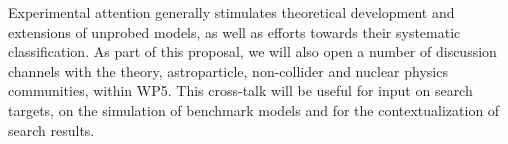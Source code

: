 Experimental attention generally stimulates theoretical development and extensions of unprobed models, as well as efforts towards their systematic classification. 
As part of this proposal, we will also open a number of discussion channels with the theory, astroparticle, non-collider and nuclear physics communities, within WP5. 
This cross-talk will be useful for input on search targets, on the simulation of benchmark models and for the contextualization of search results.